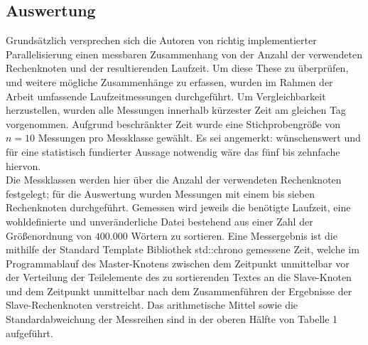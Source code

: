 \subsection{Auswertung}
Grundsätzlich versprechen sich die Autoren von richtig implementierter Parallelisierung einen messbaren Zusammenhang von der Anzahl der verwendeten Rechenknoten und der resultierenden Laufzeit.
Um diese These zu überprüfen, und weitere mögliche Zusammenhänge zu erfassen, wurden im Rahmen der Arbeit umfassende Laufzeitmessungen durchgeführt.
Um Vergleichbarkeit herzustellen, wurden alle Messungen innerhalb kürzester Zeit am gleichen Tag vorgenommen. Aufgrund beschränkter Zeit wurde eine Stichprobengröße von $n = 10$ Messungen pro Messklasse gewählt.
Es sei angemerkt: wünschenswert und für eine statistisch fundierter Aussage notwendig wäre das fünf bis zehnfache hiervon. \\
Die Messklassen werden hier über die Anzahl der verwendeten Rechenknoten festgelegt; für die Auswertung wurden Messungen mit einem bis sieben Rechenknoten durchgeführt.
Gemessen wird jeweils die benötigte Laufzeit, eine wohldefinierte und unveränderliche Datei bestehend aus einer Zahl der Größenordnung von $400.000$ Wörtern zu sortieren.
Eine Messergebnis ist die mithilfe der Standard Template Bibliothek std::chrono gemessene Zeit, welche im Programmablauf des Master-Knotens zwischen dem Zeitpunkt unmittelbar vor der Verteilung der Teilelemente 
des zu sortierenden Textes an die Slave-Knoten und dem Zeitpunkt unmittelbar nach dem Zusammenführen der Ergebnisse der Slave-Rechenknoten verstreicht.
Das arithmetische Mittel sowie die Standardabweichung der Messreihen sind in der oberen Hälfte von Tabelle 1 aufgeführt.


